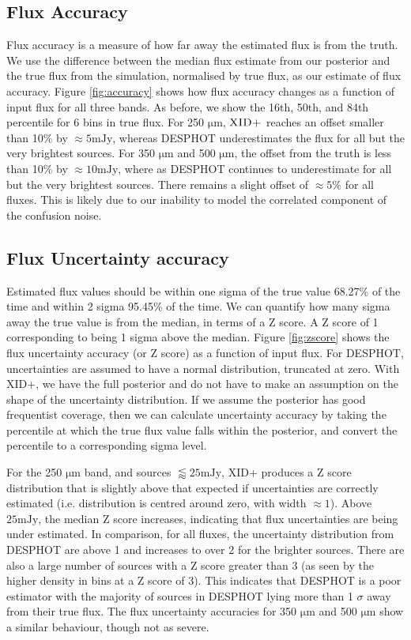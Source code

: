 \documentclass[useAMS,usenatbib]{mnras}
\begin{document}
\subsection{Flux Accuracy}
Flux accuracy is a measure of how far away the estimated flux is from the truth. We use the difference between the median flux estimate from our posterior and the true flux from the simulation, normalised by true flux, as our estimate of flux accuracy. Figure \ref{fig:accuracy} shows how flux accuracy changes as a function of input flux for all three bands. As before, we show the 16th, 50th, and 84th percentile for 6 bins in true flux. For 250 $\mathrm{\mu m}$, $\textsc{XID+}$  reaches an offset smaller than 10\% by $\approx 5 \mathrm{mJy}$, whereas \textsc{DESPHOT} underestimates the flux for all but the very brightest sources. For 350 $\mathrm{\mu m}$ and 500 $\mathrm{\mu m}$, the offset from the truth is less than 10\% by $\approx10 \mathrm{mJy}$, where as \textsc{DESPHOT} continues to underestimate for all but the very brightest sources. There remains a slight offset of $\approx5\%$ for all fluxes. This is likely due to our inability to model the correlated component of the confusion noise.

\subsection{Flux Uncertainty accuracy}\label{sec:unc}
Estimated flux values should be within one sigma of the true value 68.27\% of the time and within 2 sigma 95.45\% of the time. We can quantify how many sigma away the true value is from the median, in terms of a Z score. A Z score of 1 corresponding to being 1 sigma above the median. Figure \ref{fig:zscore} shows the flux uncertainty accuracy (or Z score) as a function of input flux. For \textsc{DESPHOT}, uncertainties are assumed to have a normal distribution, truncated at zero. With \textsc{XID+}, we have the full posterior and do not have to make an assumption on the shape of the uncertainty distribution. If we assume the posterior has good frequentist coverage, then we can calculate uncertainty accuracy by taking the percentile at which the true flux value falls within the posterior, and convert the percentile to a corresponding sigma level.

For the 250 $\mathrm{\mu m}$ band, and sources $\lessapprox25\mathrm{m Jy}$, \textsc{XID+} produces a Z score distribution that is slightly above that expected if uncertainties are correctly estimated (i.e. distribution is centred around zero, with width $\approx 1$). Above $25\mathrm{mJy}$, the median Z score increases, indicating that flux uncertainties are being under estimated. In comparison, for all fluxes, the uncertainty distribution from \textsc{DESPHOT} are above 1 and increases to over 2 for the brighter sources. There are also a large number of sources with a Z score greater than 3 (as seen by the higher density in bins at a Z score of 3). This indicates that \textsc{DESPHOT} is a poor estimator with the majority of sources in \textsc{DESPHOT} lying more than 1 $\sigma$ away from their true flux. The flux uncertainty accuracies for 350 $\mathrm{\mu m}$ and 500 $\mathrm{\mu m}$ show a similar behaviour, though not as severe.
\end{document}

